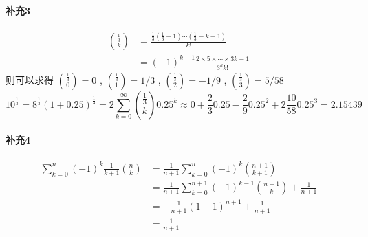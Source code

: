 \documentclass[a4paper, UTF8]{ctexart}				%
\numberwithin{equation}{section}				%
\begin{document}
    \paragraph{补充3}\quad
        \begin{equation*}
            \begin{split}
                {\frac{1}{3} \choose k}
                & = \frac{\frac{1}{3}(\frac{1}{3}-1)\cdots(\frac{1}{3}-k+1)}{k!}\\
                & = (-1)^{k-1}\frac{2 \times 5 \times \cdots \times 3k - 1}{3^k k!}
            \end{split}
        \end{equation*}
        则可以求得 ${\frac{1}{3} \choose 0} = 0$ , ${\frac{1}{3} \choose 1} = 1/3$ , ${\frac{1}{3} \choose 2} = -1/9$ , ${\frac{1}{3} \choose 3} = 5/58$
        \[
            10^{\frac{1}{3}} = 8^{\frac{1}{3}}(1+0.25)^{\frac{1}{3}} = 2\sum^{\infty}_{k=0} {\frac{1}{3} \choose k} 0.25^k \approx 0 + \frac{2}{3} 0.25 - \frac{2}{9} 0.25^2 + 2\frac{10}{58} 0.25^3 = 2.15439
        \]
    \paragraph{补充4}\quad 
        \begin{equation*}
            \begin{split}
                \sum^{n}_{k=0}(-1)^k \frac{1}{k+1} {n \choose k}
                & = \frac{1}{n+1} \sum^{n}_{k=0}(-1)^k {n + 1 \choose k + 1}\\
                & = \frac{1}{n+1} \sum^{n+1}_{k=0}(-1)^{k - 1} {n + 1 \choose k} + \frac{1}{n+1}\\
                & = -\frac{1}{n+1}(1-1)^{n+1} + \frac{1}{n+1}\\
                & = \frac{1}{n+1}
            \end{split}
        \end{equation*}
\end{document}
